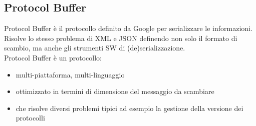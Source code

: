 \subsection{Protocol Buffer}
Protocol Buffer è il protocollo definito da Google per serializzare le informazioni. Risolve lo stesso problema di XML e JSON definendo non solo il formato di scambio, ma anche gli strumenti SW di (de)serializzazione.
\\ Protocol Buffer è un protocollo:
\begin{itemize}
    \item multi-piattaforma, multi-linguaggio 
    \item ottimizzato in termini di dimensione del messaggio da scambiare 
    \item che risolve diversi problemi tipici ad esempio la gestione della versione dei protocolli 
\end{itemize}
\vspace{2em}